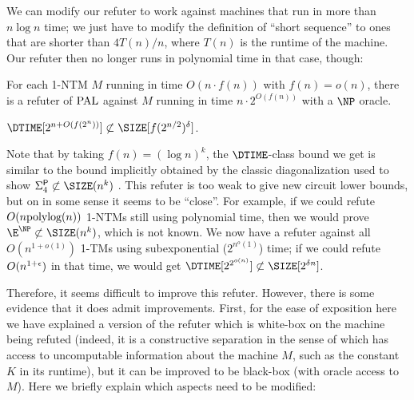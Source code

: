 We can modify our refuter to work against machines that run in more than $n \log n$ time; we just have to modify the
definition of ``short sequence'' to ones that are shorter than $4T(n)/n$, where $T(n)$ is the runtime of the machine.
Our refuter then no longer runs in polynomial time in that case, though: 

\begin{theorem}
    For each 1-NTM $M$ running in time $O(n \cdot f(n))$ with $f(n) = o(n)$, there is a refuter of $\mathrm{PAL}$ against $M$ running in time 
    $n \cdot 2^{O(f(n))}$ with a $\NP$ oracle.
\end{theorem}

\begin{corollary}
    $\DTIME[2^{n+O(f(2^n))}] \not\subset \SIZE[f(2^{n/2})^\delta]$.
\end{corollary}

Note that by taking $f(n) = (\log n)^k$, the $\DTIME$-class bound we get is similar to the bound implicitly obtained
by the classic diagonalization used to show $\Sigma^{\PTIME}_4 \not\subset \SIZE(n^k)$ \cite{Kannan82}. This refuter
is too weak to give new circuit lower bounds, but on in some sense it seems to be ``close''. For example, if we could 
refute $O(n \text{polylog}(n))$ 1-NTMs still using polynomial time, then we would prove $\E^\NP \not\subset \SIZE(n^k)$, 
which is not known. We now have a refuter against all $O(n^{1+o(1)})$ 1-TMs using subexponential ($2^{n^o(1)}$) time;
if we could refute $O(n^{1+\epsilon})$ in that time, we would get $\DTIME[2^{2^{o(n)}}] \not\subset \SIZE[2^{\delta n}]$.   

Therefore, it seems difficult to improve this refuter. However, there is some evidence that it does admit improvements.
First, for the ease of exposition here we have explained a version of the refuter which is white-box on the machine 
being refuted (indeed, it is a constructive separation in the sense of \cite{ConstructiveSeparations} which has access
to uncomputable information about the machine $M$, such as the constant $K$ in its runtime), but it can be improved 
to be black-box (with oracle access to $M$). Here we briefly explain which aspects need to be modified:

